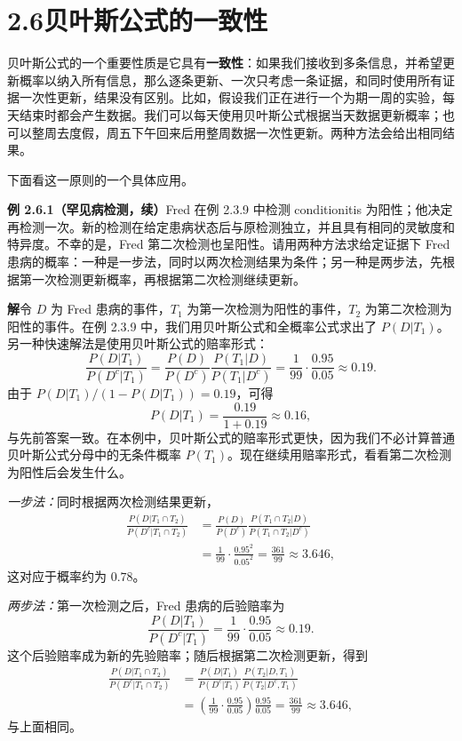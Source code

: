 \documentclass[UTF8,12pt,a4paper,fontset=fandol]{ctexart}
\begin{document}
\section*{2.6\quad 贝叶斯公式的一致性}

贝叶斯公式的一个重要性质是它具有\textbf{一致性}：如果我们接收到多条信息，并希望更新概率以纳入所有信息，那么逐条更新、一次只考虑一条证据，和同时使用所有证据一次性更新，结果没有区别。比如，假设我们正在进行一个为期一周的实验，每天结束时都会产生数据。我们可以每天使用贝叶斯公式根据当天数据更新概率；也可以整周去度假，周五下午回来后用整周数据一次性更新。两种方法会给出相同结果。

下面看这一原则的一个具体应用。

\noindent\textbf{例 2.6.1（罕见病检测，续）}\quad Fred 在例 2.3.9 中检测 conditionitis 为阳性；他决定再检测一次。新的检测在给定患病状态后与原检测独立，并且具有相同的灵敏度和特异度。不幸的是，Fred 第二次检测也呈阳性。请用两种方法求给定证据下 Fred 患病的概率：一种是一步法，同时以两次检测结果为条件；另一种是两步法，先根据第一次检测更新概率，再根据第二次检测继续更新。

\noindent\textbf{解}\quad 令 $D$ 为 Fred 患病的事件，$T_1$ 为第一次检测为阳性的事件，$T_2$ 为第二次检测为阳性的事件。在例 2.3.9 中，我们用贝叶斯公式和全概率公式求出了 $P(D|T_1)$。另一种快速解法是使用贝叶斯公式的赔率形式：
\[
  \frac{P(D|T_1)}{P(D^c|T_1)}
  =
  \frac{P(D)}{P(D^c)}\frac{P(T_1|D)}{P(T_1|D^c)}
  =
  \frac{1}{99}\cdot\frac{0.95}{0.05}
  \approx 0.19.
\]
由于 $P(D|T_1)/(1-P(D|T_1))=0.19$，可得
\[
  P(D|T_1)=\frac{0.19}{1+0.19}\approx 0.16,
\]
与先前答案一致。在本例中，贝叶斯公式的赔率形式更快，因为我们不必计算普通贝叶斯公式分母中的无条件概率 $P(T_1)$。现在继续用赔率形式，看看第二次检测为阳性后会发生什么。

\noindent\textit{一步法：}同时根据两次检测结果更新，
\[
\begin{aligned}
  \frac{P(D|T_1\cap T_2)}{P(D^c|T_1\cap T_2)}
  &=
  \frac{P(D)}{P(D^c)}
  \frac{P(T_1\cap T_2|D)}{P(T_1\cap T_2|D^c)}\\
  &=
  \frac{1}{99}\cdot\frac{0.95^2}{0.05^2}
  =
  \frac{361}{99}
  \approx 3.646,
\end{aligned}
\]
这对应于概率约为 $0.78$。

\noindent\textit{两步法：}第一次检测之后，Fred 患病的后验赔率为
\[
  \frac{P(D|T_1)}{P(D^c|T_1)}
  =
  \frac{1}{99}\cdot\frac{0.95}{0.05}
  \approx 0.19.
\]
这个后验赔率成为新的先验赔率；随后根据第二次检测更新，得到
\[
\begin{aligned}
  \frac{P(D|T_1\cap T_2)}{P(D^c|T_1\cap T_2)}
  &=
  \frac{P(D|T_1)}{P(D^c|T_1)}
  \frac{P(T_2|D,T_1)}{P(T_2|D^c,T_1)}\\
  &=
  \left(\frac{1}{99}\cdot\frac{0.95}{0.05}\right)
  \frac{0.95}{0.05}
  =
  \frac{361}{99}
  \approx 3.646,
\end{aligned}
\]
与上面相同。
\end{document}
